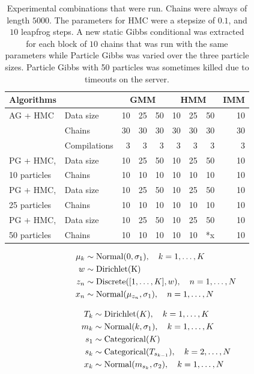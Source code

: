 \begin{table}[t]
  \centering
  \libertineTabular
  \begin{tabular}{llrrrrrrr}
    \toprule
    Algorithms & & \multicolumn{3}{c}{GMM} & \multicolumn{3}{c}{HMM} & \multicolumn{1}{c}{IMM} \\
    \midrule
    AG + HMC & Data size & 10 & 25 & 50 & 10 & 25 & 50 & 10 \\
    & Chains & 30 & 30 & 30 & 30 & 30 & 30 & 30 \\
    & Compilations & 3 & 3 & 3 & 3 & 3 & 3 & 3\\
    \addlinespace
    PG + HMC, & Data size & 10 & 25 & 50 & 10 & 25 & 50 & 10 \\
    10 particles & Chains & 10 & 10 & 10 & 10 & 10 & 10 & 10 \\
    \addlinespace
    PG + HMC, & Data size & 10 & 25 & 50 & 10 & 25 & 50 & 10 \\
    25 particles & Chains & 10 & 10 & 10 & 10 & 10 & 10 & 10 \\
    \addlinespace
    PG + HMC, & Data size & 10 & 25 & 50 & 10 & 25 & 50 & 10 \\
    50 particles & Chains & 10 & 10 & 10 & 10 & 10 & *x & 10 \\
    \bottomrule
  \end{tabular}
  \caption{Experimental combinations that were run.  Chains were always of length \(5000\).  The
    parameters for HMC were a stepsize of \(0.1\), and \(10\) leapfrog steps.  A new static Gibbs
    conditional was extracted for each block of \(10\) chains that was run with the same parameters
    while Particle Gibbs was varied over the three particle sizes.  Particle Gibbs with 50 particles
    was sometimes killed due to timeouts on the server.}
  \label{tab:autogibbs-params}
\end{table}

\begin{equation}
  \label{eq:gmm}
  \begin{aligned}
    \mu_{k} &\sim \mathrm{Normal}(0, \sigma_{1}), \quad k = 1, \ldots, K \\
    w &\sim \mathrm{Dirichlet(K)} \\
    z_{n} &\sim \mathrm{Discrete}([1, \ldots, K], w), \quad n = 1, \ldots, N \\
    x_{n} &\sim \mathrm{Normal}(\mu_{z_{n}}, \sigma_{1}), \quad n = 1, \ldots, N
  \end{aligned}
\end{equation}

\begin{equation}
  \label{eq:hmm}
  \begin{aligned}
    T_{k} &\sim \mathrm{Dirichlet}(K), \quad k = 1, \ldots, K \\
    m_{k} &\sim \mathrm{Normal}(k, \sigma_{1}), \quad k = 1, \ldots, K \\
    s_{1} &\sim \mathrm{Categorical}(K) \\
    s_{k} &\sim \mathrm{Categorical}(T_{s_{k-1}}), \quad k = 2, \ldots, N \\
    x_{k} &\sim \mathrm{Normal}(m_{s_{k}}, \sigma_{2}), \quad k = 1, \ldots, N
  \end{aligned}
\end{equation}

